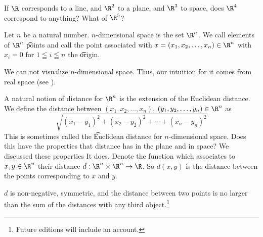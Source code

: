 

If $\R$ corresponds to a line, and $\R^2$ to a plane, and $\R^3$ to space, does $\R^4$ correspond to anything? What of $\R^5$?


Let $n$ be a natural number.
\t{$n$-dimensional space} is the set $\R^n$.
We call elements of $\R^n$ \t{points} and call the point associated with $x = (x_1, x_2, \dots, x_n) \in \R^n$ with $x_i = 0$ for $1 \leqq i \leqq n$ the \t{origin}.


We can not visualize $n$-dimensional space.
Thus, our intuition for it comes from real space (see ).


A natural notion of distance for $\R^n$ is the extension of the Euclidean distance. We define the distance between $(x_1, x_2, \dots, x_n)$, $(y_1, y_2, \dots, y_n) \in \R^n$ as
\[
  \sqrt{(x_1 - y_1)^2 + (x_2 - y_2)^2 + \cdots + (x_n - y_n)^2}
\]
This is sometimes called the \t{Euclidean distance for $n$-dimensional space}.
Does this have the properties that distance has in the plane and in space?
We discussed these properties
It does.
Denote the function which associates to $x, y \in \R^n$ their distance $d: \R^n \times \R^n \to \R$.
So $d(x, y)$ is the distance between the points corresponding to $x$ and $y$.
\begin{proposition}
  $d$ is non-negative, symmetric, and the distance between two points is no larger than the sum of the distances with any third object.\footnote{Future editions will include an account.}
\end{proposition}

